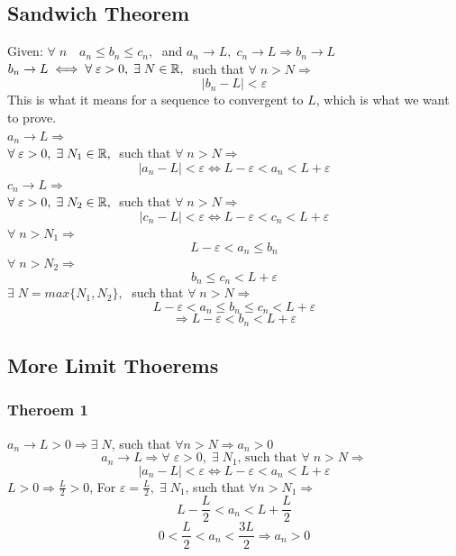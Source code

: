 \subsection{Sandwich Theorem}
Given: $\forall\; n\quad a_n\leq b_n\leq c_n,\;$ and $a_n\rightarrow L,\; c_n\rightarrow L \Longrightarrow b_n\rightarrow L$\\
$b_n\rightarrow L \iff \forall\; \varepsilon>0,\; \exists\; N\in \mathbb{R},\;$ such that $\forall\; n>N \Longrightarrow$
\[
    |b_n-L|<\varepsilon
\]
This is what it means for a sequence to convergent to $L$, which is what we want to prove.\\
    $a_n\rightarrow L \Longrightarrow$\\
    $\forall\; \varepsilon>0,\;\exists\; N_1\in \mathbb{R},\;$ such that $\forall\; n>N\Longrightarrow$
    \[
        |a_n-L|<\varepsilon \iff L-\varepsilon<a_n<L+\varepsilon
    \]
    $c_n\rightarrow L \Longrightarrow$\\
    $\forall\; \varepsilon>0,\;\exists\; N_2\in \mathbb{R},\;$ such that $\forall\; n>N\Longrightarrow$
    \[
        |c_n-L|<\varepsilon \iff L-\varepsilon<c_n<L+\varepsilon
    \]
    $\forall\; n>N_1 \Longrightarrow$
    \[
        L-\varepsilon<a_n\leq b_n
    \]
    $\forall\; n>N_2 \Longrightarrow$
    \[
        b_n\leq c_n<L+\varepsilon
    \]
    $\exists\; N=max\{N_1,N_2\},\;$ such that $\forall\; n>N\Longrightarrow$
    \[
        L-\varepsilon<a_n\leq b_n\leq c_n<L+\varepsilon
    \]
    \[
        \Longrightarrow L-\varepsilon<b_n<L+\varepsilon
    \]

\newpage
\subsection{More Limit Thoerems}
\subsubsection{Theroem 1}
$a_n \rightarrow L>0 \Longrightarrow \exists\; N$, such that $\forall n>N \Longrightarrow a_n>0$\\
\[
    a_n \rightarrow L \Longrightarrow \forall\; \varepsilon >0,\; \exists\; N_1 \text{, such that } \forall\; n>N \Longrightarrow
    \]
\[        
    |a_n-L|<\varepsilon \iff L-\varepsilon<a_n<L+\varepsilon
\]
$L>0 \Longrightarrow \frac{L}{2}>0$, For $\varepsilon = \frac{L}{2},\; \exists\; N_1$, such that $\forall n>N_1 \Longrightarrow$
\[
    L-\frac{L}{2}<a_n<L+\frac{L}{2}
\]
\[
    0<\frac{L}{2}<a_n<\frac{3L}{2} \Longrightarrow a_n>0
\]
